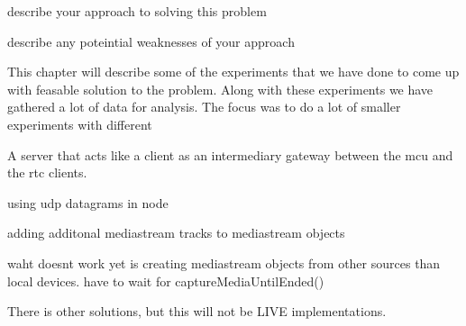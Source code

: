 
describe your approach to solving this problem

describe any poteintial weaknesses of your 
approach


This chapter will describe some of the experiments that we have done to come up with feasable solution to the problem. Along with these experiments we have gathered a lot of data for analysis. The focus was to do a lot of smaller experiments with different \gls{}

A server that acts like a client as an intermediary gateway between the mcu and the rtc clients.

using udp datagrams in node

adding additonal mediastream tracks to mediastream objects


waht doesnt work yet is
creating mediastream objects from other sources than local devices. have to wait for captureMediaUntilEnded()

There is other solutions, but this will not be LIVE implementations.

